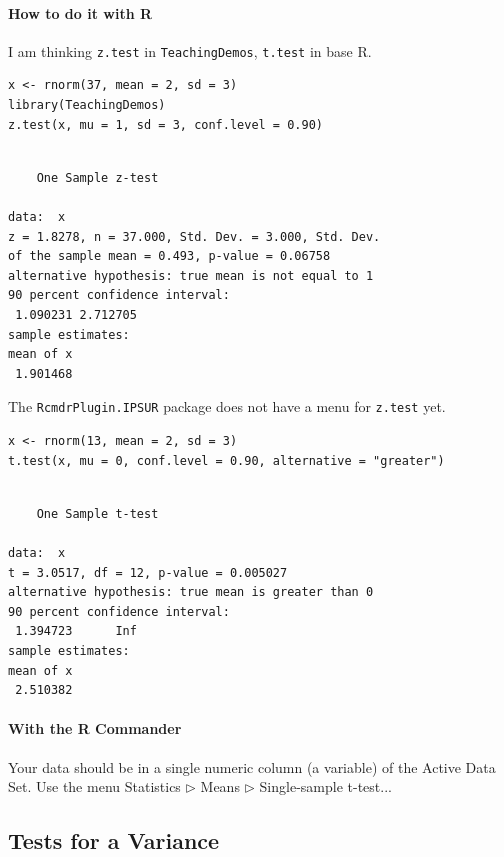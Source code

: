 \documentclass[captions=tableheading]{scrbook}
\begin{document}
\paragraph*{How to do it with \textsf{R}}

I am thinking \texttt{z.test} in \texttt{TeachingDemos}, \texttt{t.test} in base \textsf{\small R}.


\begin{verbatim}
x <- rnorm(37, mean = 2, sd = 3)
library(TeachingDemos)
z.test(x, mu = 1, sd = 3, conf.level = 0.90)
\end{verbatim}


\begin{verbatim}
 
	One Sample z-test

data:  x 
z = 1.8278, n = 37.000, Std. Dev. = 3.000, Std. Dev.
of the sample mean = 0.493, p-value = 0.06758
alternative hypothesis: true mean is not equal to 1 
90 percent confidence interval:
 1.090231 2.712705 
sample estimates:
mean of x 
 1.901468
\end{verbatim}

The \texttt{RcmdrPlugin.IPSUR} package does not have a menu for \texttt{z.test} yet. 


\begin{verbatim}
x <- rnorm(13, mean = 2, sd = 3)
t.test(x, mu = 0, conf.level = 0.90, alternative = "greater")
\end{verbatim}


\begin{verbatim}

	One Sample t-test

data:  x 
t = 3.0517, df = 12, p-value = 0.005027
alternative hypothesis: true mean is greater than 0 
90 percent confidence interval:
 1.394723      Inf 
sample estimates:
mean of x 
 2.510382
\end{verbatim}

\paragraph*{With the \textsf{R} Commander}

Your data should be in a single numeric column (a variable) of the Active Data Set. Use the menu \textsf{Statistics \(\triangleright\) Means \(\triangleright\) Single-sample t-test...} 
\subsection{Tests for a Variance}
\label{sec-10-2-2}
\end{document}

